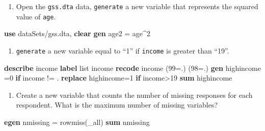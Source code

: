 \documentclass[
]{book}
\newenvironment{Shaded}{\begin{snugshade}}{\end{snugshade}}
\newcommand{\DataTypeTok}[1]{\textcolor[rgb]{0.13,0.29,0.53}{#1}}
\newcommand{\FunctionTok}[1]{\textcolor[rgb]{0.00,0.00,0.00}{#1}}
\newcommand{\KeywordTok}[1]{\textcolor[rgb]{0.13,0.29,0.53}{\textbf{#1}}}
\newcommand{\NormalTok}[1]{#1}
\newcommand{\OtherTok}[1]{\textcolor[rgb]{0.56,0.35,0.01}{#1}}
\providecommand{\tightlist}{%
  \setlength{\itemsep}{0pt}\setlength{\parskip}{0pt}}
\begin{document}
\begin{alert}

\begin{enumerate}
\def\labelenumi{\arabic{enumi}.}
\tightlist
\item
  Open the \texttt{gss.dta} data, \texttt{generate} a new variable that represents the squared value of \texttt{age}.
\end{enumerate}

\begin{Shaded}
\begin{Highlighting}[]
\KeywordTok{use}\NormalTok{ dataSets/gss.dta, }\KeywordTok{clear}
\KeywordTok{gen}\NormalTok{ age2 = age\^{}2}
\end{Highlighting}
\end{Shaded}

\begin{enumerate}
\def\labelenumi{\arabic{enumi}.}
\setcounter{enumi}{1}
\tightlist
\item
  \texttt{generate} a new variable equal to ``1'' if \texttt{income} is greater than ``19''.
\end{enumerate}

\begin{Shaded}
\begin{Highlighting}[]
\KeywordTok{describe}\NormalTok{ income}
\KeywordTok{label} \OtherTok{list}\NormalTok{ income}
\KeywordTok{recode}\NormalTok{ income (99=.) (98=.)}
\KeywordTok{gen}\NormalTok{ highincome =0 }\KeywordTok{if}\NormalTok{ income != .}
\KeywordTok{replace}\NormalTok{ highincome=1 }\KeywordTok{if}\NormalTok{ income\textgreater{}19}
\KeywordTok{sum}\NormalTok{ highincome}
\end{Highlighting}
\end{Shaded}

\begin{enumerate}
\def\labelenumi{\arabic{enumi}.}
\setcounter{enumi}{2}
\tightlist
\item
  Create a new variable that counts the number of missing responses for each respondent. What is the maximum number of missing variables?
\end{enumerate}

\begin{Shaded}
\begin{Highlighting}[]
\KeywordTok{egen}\NormalTok{ nmissing = }\FunctionTok{rowmiss}\NormalTok{(}\DataTypeTok{\_all}\NormalTok{)}
\KeywordTok{sum}\NormalTok{ nmissing}
\end{Highlighting}
\end{Shaded}

\end{alert}
\end{document}
